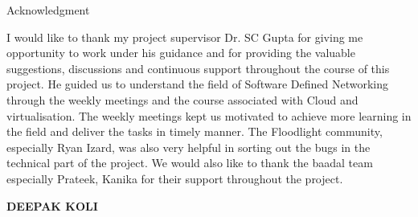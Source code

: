 \begin{center}
\LARGE{Acknowledgment} 
\end{center}

\vspace{0.5in}


I would like to thank my project supervisor Dr. SC Gupta for giving me opportunity to work under his guidance and for providing the valuable suggestions, discussions and continuous support throughout the course of this project. He guided us to understand the field of Software Defined Networking through the weekly meetings and the course associated with Cloud and virtualisation. The weekly meetings kept us motivated to achieve more learning in the field and deliver the tasks in timely manner. The Floodlight community, especially Ryan Izard, was also very helpful in sorting out the bugs in the technical part of the project. We would also like to thank the baadal team especially Prateek, Kanika for their support throughout the project. 

\vspace{1.5in}

{\bfseries DEEPAK KOLI}
